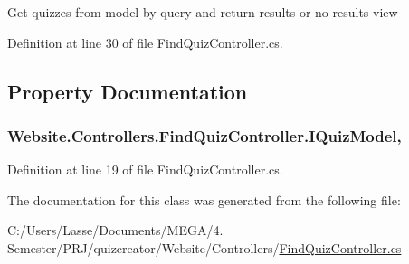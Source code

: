 Get quizzes from model by query and return results or no-\/results view 



Definition at line 30 of file Find\+Quiz\+Controller.\+cs.



\subsection{Property Documentation}
\hypertarget{class_website_1_1_controllers_1_1_find_quiz_controller_a900cc3a2c724ee91d70c158cb25cae71}{}
\subsubsection[{I\+Quiz\+Model}]{ Website.\+Controllers.\+Find\+Quiz\+Controller.\+I\+Quiz\+Model\hspace{0.3cm}{\ttfamily [get]}, {\ttfamily [set]}}\label{class_website_1_1_controllers_1_1_find_quiz_controller_a900cc3a2c724ee91d70c158cb25cae71}


Definition at line 19 of file Find\+Quiz\+Controller.\+cs.



The documentation for this class was generated from the following file\+:\begin{DoxyCompactItemize}
\item 
C\+:/\+Users/\+Lasse/\+Documents/\+M\+E\+G\+A/4. Semester/\+P\+R\+J/quizcreator/\+Website/\+Controllers/\hyperlink{_find_quiz_controller_8cs}{Find\+Quiz\+Controller.\+cs}\end{DoxyCompactItemize}
